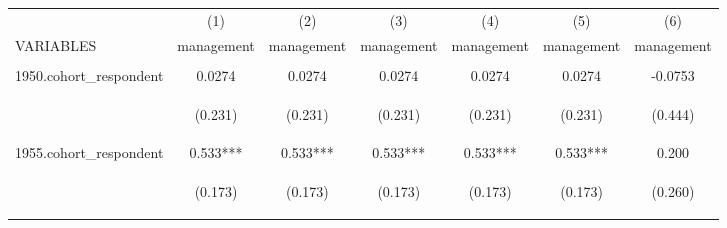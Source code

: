 \begin{center}
\begin{tabular}{lcccccc} \hline
 & (1) & (2) & (3) & (4) & (5) & (6) \\
VARIABLES & management & management & management & management & management & management \\ \hline
\vspace{4pt} & \begin{footnotesize}\end{footnotesize} & \begin{footnotesize}\end{footnotesize} & \begin{footnotesize}\end{footnotesize} & \begin{footnotesize}\end{footnotesize} & \begin{footnotesize}\end{footnotesize} & \begin{footnotesize}\end{footnotesize} \\
1950.cohort\_respondent & 0.0274 & 0.0274 & 0.0274 & 0.0274 & 0.0274 & -0.0753 \\
\vspace{4pt} & \begin{footnotesize}(0.231)\end{footnotesize} & \begin{footnotesize}(0.231)\end{footnotesize} & \begin{footnotesize}(0.231)\end{footnotesize} & \begin{footnotesize}(0.231)\end{footnotesize} & \begin{footnotesize}(0.231)\end{footnotesize} & \begin{footnotesize}(0.444)\end{footnotesize} \\
1955.cohort\_respondent & 0.533*** & 0.533*** & 0.533*** & 0.533*** & 0.533*** & 0.200 \\
\vspace{4pt} & \begin{footnotesize}(0.173)\end{footnotesize} & \begin{footnotesize}(0.173)\end{footnotesize} & \begin{footnotesize}(0.173)\end{footnotesize} & \begin{footnotesize}(0.173)\end{footnotesize} & \begin{footnotesize}(0.173)\end{footnotesize} & \begin{footnotesize}(0.260)\end{footnotesize} \\

\end{tabular}
\end{center}
